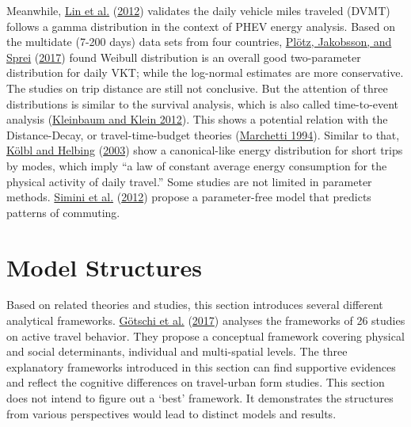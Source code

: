 \documentclass[
  11pt,
  openany]{memoir}
\begin{document}
Meanwhile, \protect\hyperlink{ref-linEstimationEnergyUse2012}{Lin et al.} (\protect\hyperlink{ref-linEstimationEnergyUse2012}{2012}) validates the daily vehicle miles traveled (DVMT) follows a gamma distribution in the context of PHEV energy analysis. Based on the multidate (7-200 days) data sets from four countries, \protect\hyperlink{ref-plotzDistributionIndividualDaily2017}{Plötz, Jakobsson, and Sprei} (\protect\hyperlink{ref-plotzDistributionIndividualDaily2017}{2017}) found Weibull distribution is an overall good two-parameter distribution for daily VKT; while the log-normal estimates are more conservative. The studies on trip distance are still not conclusive. But the attention of three distributions is similar to the survival analysis, which is also called time-to-event analysis (\protect\hyperlink{ref-kleinbaumSurvivalAnalysisSelfLearning2012}{Kleinbaum and Klein 2012}). This shows a potential relation with the Distance-Decay, or travel-time-budget theories (\protect\hyperlink{ref-marchettiAnthropologicalInvariantsTravel1994}{Marchetti 1994}). Similar to that, \protect\hyperlink{ref-kolblEnergyLawsHuman2003}{Kölbl and Helbing} (\protect\hyperlink{ref-kolblEnergyLawsHuman2003}{2003}) show a canonical-like energy distribution for short trips by modes, which imply ``a law of constant average energy consumption for the physical activity of daily travel.'' Some studies are not limited in parameter methods. \protect\hyperlink{ref-siminiUniversalModelMobility2012}{Simini et al.} (\protect\hyperlink{ref-siminiUniversalModelMobility2012}{2012}) propose a parameter-free model that predicts patterns of commuting.

\hypertarget{struc}{%
\chapter{Model Structures}\label{struc}}

Based on related theories and studies, this section introduces several different analytical frameworks. \protect\hyperlink{ref-gotschiComprehensiveConceptualFramework2017}{Götschi et al.} (\protect\hyperlink{ref-gotschiComprehensiveConceptualFramework2017}{2017}) analyses the frameworks of 26 studies on active travel behavior. They propose a conceptual framework covering physical and social determinants, individual and multi-spatial levels. The three explanatory frameworks introduced in this section can find supportive evidences and reflect the cognitive differences on travel-urban form studies. This section does not intend to figure out a `best' framework. It demonstrates the structures from various perspectives would lead to distinct models and results.
\end{document}
